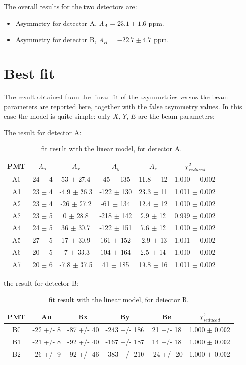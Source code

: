 The overall results for the two detectors are: 
\begin{itemize}
\item Asymmetry for detector A, $A_{A} =  23.1 \pm 1.6$ ppm.
\item Asymmetry for detector B, $A_{B} = -22.7 \pm 4.7$ ppm.
\end{itemize}


\section{Best fit}
The result obtained from the linear fit of the asymmetries versus the beam parameters are reported here, together with the false asymmetry values. In this case the model is quite simple: only $X$, $Y$, $E$ are the beam parameters:

The result for detector A:
\begin{table}[h] 
\centering
\begin{tabular}{c|c|c|c|c|c}
\hline
 PMT   & $A_{n}$    & $A_{x}$          & $A_{y}$            & $A_{e}$         & $\chi^{2}_{reduced}$ \\
\hline
 A0    & 24 $\pm$ 4 & 53 $\pm$ 27.4  & -45 $\pm$ 135  & 11.8 $\pm$ 12 & 1.000 $\pm$ 0.002   \\
 A1    & 23 $\pm$ 4 & -4.9 $\pm$ 26.3  & -122 $\pm$ 130 & 23.3 $\pm$ 11 & 1.001 $\pm$ 0.002 \\
 A2    & 23 $\pm$ 4 & -26 $\pm$ 27.2 & -61 $\pm$ 134  & 12.4 $\pm$ 12 & 1.000 $\pm$ 0.002   \\
 A3    & 23 $\pm$ 5 & 0 $\pm$ 28.8   & -218 $\pm$ 142 & 2.9 $\pm$ 12  & 0.999 $\pm$ 0.002 \\
 A4    & 24 $\pm$ 5 & 36 $\pm$ 30.7  & -122 $\pm$ 151 & 7.6 $\pm$ 12  & 1.000 $\pm$ 0.002   \\
 A5    & 27 $\pm$ 5 & 17 $\pm$ 30.9  & 161 $\pm$ 152  & -2.9 $\pm$ 13 & 1.001 $\pm$ 0.002 \\
 A6    & 20 $\pm$ 5 & -7 $\pm$ 33.3  & 104 $\pm$ 164  & 2.5 $\pm$ 14  & 1.000 $\pm$ 0.002   \\
 A7    & 20 $\pm$ 6 & -7.8 $\pm$ 37.5  & 41 $\pm$ 185   & 19.8 $\pm$ 16 & 1.001 $\pm$ 0.002 \\
\hline
\end{tabular}
\caption{fit result with the linear model, for detector A.}
\label{tb:resultA}
\end{table}

the result for detector B:
\begin{table}[h]
\centering
\begin{tabular}{c|c|c|c|c|c}
\hline
 PMT   & An         & Bx         & By           & Be        & $\chi^{2}_{reduced}$\\
\hline
 B0    & -22 +/- 8  & -87 +/- 40 & -243 +/- 186 & 21 +/- 18 & 1.000 $\pm$ 0.002\\
 B1    & -21 +/- 8  & -92 +/- 40 & -167 +/- 187 & 14 +/- 18 & 1.000 $\pm$ 0.002\\
 B2    & -26 +/- 9  & -92 +/- 46 & -383 +/- 210 & -24 +/- 20& 1.000 $\pm$ 0.002\\
\hline
\end{tabular}
\caption{fit result with the linear model, for detector B.}
\end{table}

